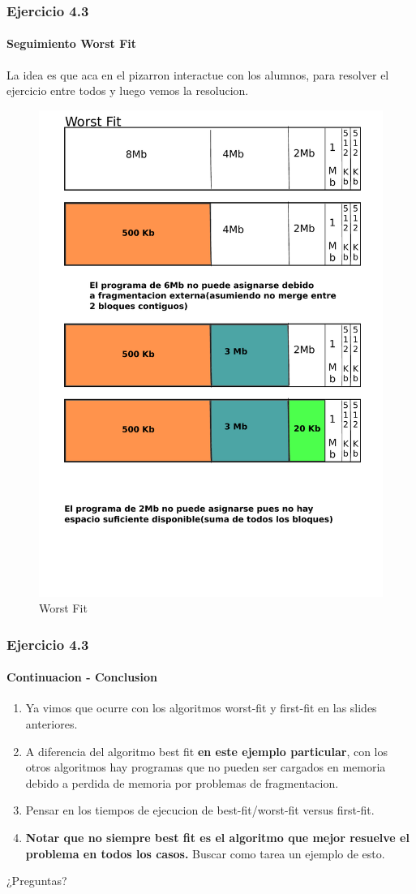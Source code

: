\documentclass{beamer}
\begin{document}
\begin{frame}
  \frametitle{Ejercicio 4.3}    
  \framesubtitle{Seguimiento Worst Fit}
  La idea es que aca en el pizarron interactue con los alumnos, para resolver el ejercicio entre todos y luego vemos la resolucion.
   \begin{figure}[h!]
    \centering        
      \includegraphics[scale=0.25]{worst-fit.pdf}
    \caption{Worst Fit}
  \end{figure}
\end{frame}

\begin{frame}
  \frametitle{Ejercicio 4.3}    
  \framesubtitle{Continuacion - Conclusion}    
    \begin{enumerate}
    \setlength{\itemsep}{5pt}    
    \item Ya vimos que ocurre con los algoritmos worst-fit y first-fit en las slides anteriores.
    \pause
    \item A diferencia del algoritmo best fit \textbf{en este ejemplo particular}, con los otros algoritmos hay programas que no pueden ser cargados en memoria debido a perdida de memoria por problemas de fragmentacion.
    \pause
    \item Pensar en los tiempos de ejecucion de best-fit/worst-fit versus first-fit.
    \pause
    \item \textbf{Notar que no siempre best fit es el algoritmo que mejor resuelve el problema en todos los casos.} Buscar como tarea un ejemplo de esto.
  \end{enumerate}
\end{frame}

\begin{frame}
  \begin{center}
  \huge ¿Preguntas?
  \end{center}
\end{frame}
\end{document}
